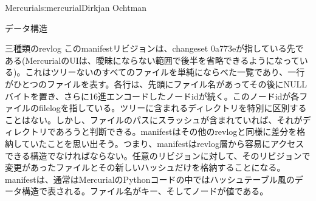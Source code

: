 \begin{aosachapter}{Mercurial}{s:mercurial}{Dirkjan Ochtman}
\begin{aosasect1}{データ構造}
\begin{aosasect2}{三種類のrevlog}
\noindent このmanifestリビジョンは、changeset 0a773eが指している先である(MercurialのUIは、曖昧にならない範囲で後半を省略できるようになっている)。これはツリーないのすべてのファイルを単純にならべた一覧であり、一行がひとつのファイルを表す。各行は、先頭にファイル名があってその後にNULLバイトを置き、さらに16進エンコードしたノードidが続く。このノードidが各ファイルのfilelogを指している。ツリーに含まれるディレクトリを特別に区別することはない。しかし、ファイルのパスにスラッシュが含まれていれば、それがディレクトリであろうと判断できる。manifestはその他のrevlogと同様に差分を格納していたことを思い出そう。つまり、manifestはrevlog層から容易にアクセスできる構造でなければならない。任意のリビジョンに対して、そのリビジョンで変更があったファイルとその新しいハッシュだけを格納することになる。manifestは、通常はMercurialのPythonコードの中ではハッシュテーブル風のデータ構造で表される。ファイル名がキー、そしてノードが値である。


\end{aosasect2}
\end{aosasect1}
\end{aosachapter}
